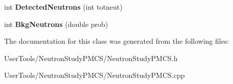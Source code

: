 \begin{DoxyCompactItemize}
\item 
\hypertarget{classNeutronStudyPMCS_aadac422e432f47ceae16a87a8d2679bb}{int {\bfseries Detected\-Neutrons} (int totneut)}\label{classNeutronStudyPMCS_aadac422e432f47ceae16a87a8d2679bb}

\item 
\hypertarget{classNeutronStudyPMCS_a73c188dfa2d0465729cc3e7c2d68a1bd}{int {\bfseries Bkg\-Neutrons} (double prob)}\label{classNeutronStudyPMCS_a73c188dfa2d0465729cc3e7c2d68a1bd}

\end{DoxyCompactItemize}


The documentation for this class was generated from the following files\-:\begin{DoxyCompactItemize}
\item 
User\-Tools/\-Neutron\-Study\-P\-M\-C\-S/Neutron\-Study\-P\-M\-C\-S.\-h\item 
User\-Tools/\-Neutron\-Study\-P\-M\-C\-S/Neutron\-Study\-P\-M\-C\-S.\-cpp\end{DoxyCompactItemize}
